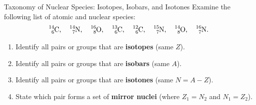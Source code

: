 \begin{exercise}{Taxonomy of Nuclear Species: Isotopes, Isobars, and Isotones}
Examine the following list of atomic and nuclear species:
\[
\ce{^{14}_{6}C}, \quad \ce{^{14}_{7}N}, \quad \ce{^{16}_{8}O}, \quad \ce{^{13}_{6}C}, \quad \ce{^{12}_{6}C}, \quad \ce{^{15}_{7}N}, \quad \ce{^{14}_{8}O}, \quad \ce{^{16}_{7}N}.
\]
\begin{enumerate}[leftmargin=1.5em,itemsep=2pt]
  \item Identify all pairs or groups that are \textbf{isotopes} (same $Z$).
  \item Identify all pairs or groups that are \textbf{isobars} (same $A$).
  \item Identify all pairs or groups that are \textbf{isotones} (same $N = A - Z$).
  \item State which pair forms a set of \textbf{mirror nuclei} (where $Z_1 = N_2$ and $N_1 = Z_2$).
\end{enumerate}
\end{exercise}

\begin{tabletworkspace}[5.0cm]
\end{tabletworkspace}

